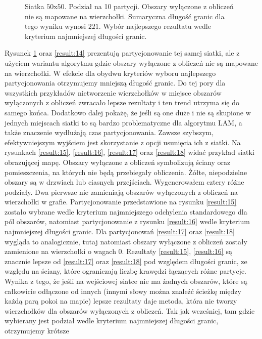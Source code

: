 \begin{figure}[h]
\begin{subfigure}{.33\textwidth}
    \caption[short]{}
\end{subfigure}
\caption{Siatka $50$x$50$. Podział na 10 partycji.
Obszary wyłączone z obliczeń nie są mapowane na wierzchołki.
Sumaryczna długość granic dla tego wyniku wynosi $221$.
Wybór najlepszego rezultatu wedle kryterium najmniejszej długości granic.}
\label{result:13}
\end{figure}
Rysunek \ref{result:13} oraz \ref{result:14} prezentują partycjonowanie tej samej siatki, ale z użyciem wariantu algorytmu
gdzie obszary wyłączone z obliczeń nie są mapowane na wierzchołki.
W efekcie dla obydwu kryteriów wyboru najlepszego partycjonowania otrzymujemy mniejszą długość granic.
Do tej pory dla wszystkich przykładów nietworzenie wierzchołków w miejsce obszarów wyłączonych z obliczeń
zwracało lepsze rezultaty i ten trend utrzyma się do samego końca.
Dodatkowo dalej pokażę, że jeśli są one duże i nie są skupione w jednych miejscach siatki to są bardzo
problematyczne dla algorytmu LAM, a także znaczenie wydłużają czas partycjonowania.
Zawsze szybszym, efektywniejszym wyjściem jest skorzystanie z opcji usunięcia ich z siatki.
\FloatBarrier
\vspace{4mm}
Na rysunkach \ref{result:15}, \ref{result:16}, \ref{result:17} oraz \ref{result:18} widać przykład siatki obrazującej
mapę.
Obszary wyłączone z obliczeń symbolizują ściany oraz pomieszczenia, na których nie będą przebiegały obliczenia.
Żółte, niepodzielne obszary są w drzwiach lub ciasnych przejściach.
Wygenerowałem cztery różne podziały.
Dwa pierwsze nie zamieniają obszarów wyłączonych z obliczeń na wierzchołki w grafie.
Partycjonowanie przedstawione na rysunku \ref{result:15} zostało wybrane wedle kryterium najmniejszego odchylenia standardowego dla pól obszarów,
natomiast partycjonowanie z rysunku \ref{result:16} wedle kryterium najmniejszej długości granic.
Dla partycjonowań \ref{result:17} oraz \ref{result:18} wygląda to analogicznie, tutaj natomiast obszary wyłączone z obliczeń
zostały zamienione na wierzchołki o wagach $0$.
Rezultaty \ref{result:15}, \ref{result:16} są znacznie lepsze od \ref{result:17} oraz \ref{result:18} pod względem
długości granic, ze względu na ściany, które ograniczają liczbę krawędzi łączących różne partycje.
Wynika z tego, że jeśli na wejściowej siatce nie ma żadnych obszarów, które są całkowicie odłączone od innych
(innymi słowy można znaleźć ścieżkę między każdą parą pokoi na mapie)
lepsze rezultaty daje metoda, która nie tworzy wierzchołków dla obszarów wyłączonych z obliczeń.
Tak jak wcześniej, tam gdzie wybierany jest podział wedle kryterium najmniejszej długości granic, otrzymujemy krótsze
